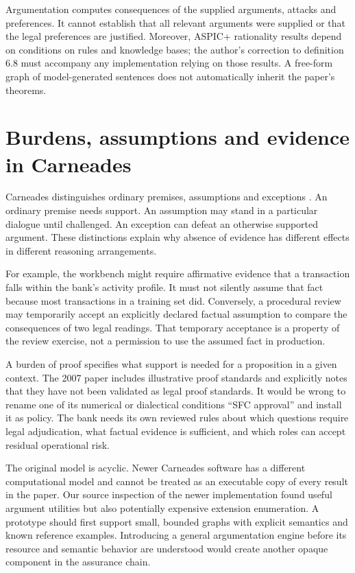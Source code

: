 \documentclass[12pt,a4paper,oneside,openany]{book}
\begin{document}
Argumentation computes consequences of the supplied arguments, attacks and
preferences. It cannot establish that all relevant arguments were supplied or
that the legal preferences are justified. Moreover, ASPIC+ rationality results
depend on conditions on rules and knowledge bases; the author's correction to
definition 6.8 must accompany any implementation relying on those results. A
free-form graph of model-generated sentences does not automatically inherit the
paper's theorems.

\section{Burdens, assumptions and evidence in Carneades}
\label{merge:M05:05}


Carneades distinguishes ordinary premises, assumptions and exceptions
\citep[sections 3--6]{carneades2007}. An ordinary premise needs support. An
assumption may stand in a particular dialogue until challenged. An exception can
defeat an otherwise supported argument. These distinctions explain why absence
of evidence has different effects in different reasoning arrangements.

For example, the workbench might require affirmative evidence that a transaction
falls within the bank's activity profile. It must not silently assume that fact
because most transactions in a training set did. Conversely, a procedural review
may temporarily accept an explicitly declared factual assumption to compare the
consequences of two legal readings. That temporary acceptance is a property of
the review exercise, not a permission to use the assumed fact in production.

A burden of proof specifies what support is needed for a proposition in a given
context. The 2007 paper includes illustrative proof standards and explicitly
notes that they have not been validated as legal proof standards. It would be
wrong to rename one of its numerical or dialectical conditions ``SFC approval''
and install it as policy. The bank needs its own reviewed rules about which
questions require legal adjudication, what factual evidence is sufficient, and
which roles can accept residual operational risk.

The original model is acyclic. Newer Carneades software has a different
computational model and cannot be treated as an executable copy of every result
in the paper. Our source inspection of the newer implementation found useful
argument utilities but also potentially expensive extension enumeration. A
prototype should first support small, bounded graphs with explicit semantics and
known reference examples. Introducing a general argumentation engine before its
resource and semantic behavior are understood would create another opaque
component in the assurance chain.
\end{document}
